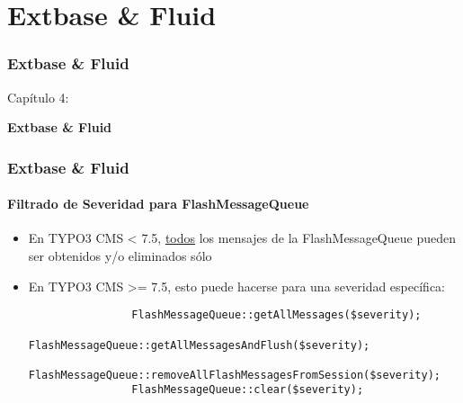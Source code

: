 %

\section{Extbase \& Fluid}
\begin{frame}[fragile]
	\frametitle{Extbase \& Fluid}

	\begin{center}\huge{Capítulo 4:}\end{center}
	\begin{center}\huge{\color{typo3darkgrey}\textbf{Extbase \& Fluid}}\end{center}

\end{frame}


\begin{frame}[fragile]
	\frametitle{Extbase \& Fluid}
	\framesubtitle{Filtrado de Severidad para FlashMessageQueue}

	\begin{itemize}

		\item En TYPO3 CMS < 7.5, \underline{todos} los mensajes de la FlashMessageQueue pueden ser
			obtenidos y/o eliminados sólo

		\item En TYPO3 CMS >= 7.5, esto puede hacerse para una severidad específica:

			\begin{lstlisting}
				FlashMessageQueue::getAllMessages($severity);
				FlashMessageQueue::getAllMessagesAndFlush($severity);
				FlashMessageQueue::removeAllFlashMessagesFromSession($severity);
				FlashMessageQueue::clear($severity);
			\end{lstlisting}

	\end{itemize}

\end{frame}

